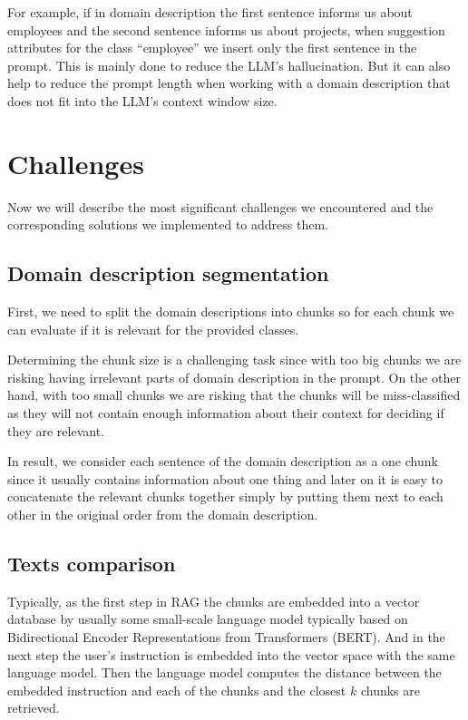 For example, if in domain description the first sentence informs us about employees and the second sentence informs us about projects, when suggestion attributes for the class ``employee'' we insert only the first sentence in the prompt. This is mainly done to reduce the LLM's hallucination. But it can also help to reduce the prompt length when working with a domain description that does not fit into the LLM's context window size.



\section{Challenges}

Now we will describe the most significant challenges we encountered and the corresponding solutions we implemented to address them.

\subsection{Domain description segmentation}
First, we need to split the domain descriptions into chunks so for each chunk we can evaluate if it is relevant for the provided classes.

Determining the chunk size is a challenging task since with too big chunks we are risking having irrelevant parts of domain description in the prompt. On the other hand, with too small chunks we are risking that the chunks will be miss-classified as they will not contain enough information about their context for deciding if they are relevant.

In result, we consider each sentence of the domain description as a one chunk since it usually contains information about one thing and later on it is easy to concatenate the relevant chunks together simply by putting them next to each other in the original order from the domain description.


\subsection{Texts comparison}

Typically, as the first step in RAG the chunks are embedded into a vector database by usually some small-scale language model typically based on Bidirectional Encoder Representations from Transformers (BERT). And in the next step the user's instruction is embedded into the vector space with the same language model. Then the language model computes the distance between the embedded instruction and each of the chunks and the closest $k$ chunks are retrieved.

